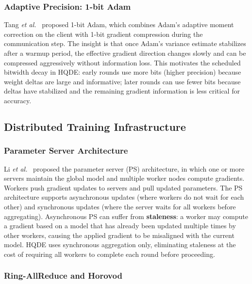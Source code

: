 \documentclass[journal,twoside]{IEEEtran}
\newcommand{\hqde}{\mbox{HQDE}\xspace}
\newcommand{\etal}{\textit{et al.}\xspace}
\begin{document}
\subsubsection{Adaptive Precision: 1-bit Adam}

Tang \etal~\cite{tang2021onebitadam} proposed 1-bit Adam, which
combines Adam's adaptive moment correction on the client with 1-bit
gradient compression during the communication step. The insight is
that once Adam's variance estimate stabilizes after a warmup period,
the effective gradient direction changes slowly and can be compressed
aggressively without information loss. This motivates the scheduled
bitwidth decay in \hqde{}: early rounds use more bits (higher precision)
because weight deltas are large and informative; later rounds can use
fewer bits because deltas have stabilized and the remaining gradient
information is less critical for accuracy.

\subsection{Distributed Training Infrastructure}

\subsubsection{Parameter Server Architecture}

Li \etal~\cite{li2014ps} proposed the parameter server (PS)
architecture, in which one or more servers maintain the global model
and multiple worker nodes compute gradients. Workers push gradient
updates to servers and pull updated parameters. The PS architecture
supports asynchronous updates (where workers do not wait for each other)
and synchronous updates (where the server waits for all workers before
aggregating). Asynchronous PS can suffer from \textbf{staleness}: a
worker may compute a gradient based on a model that has already been
updated multiple times by other workers, causing the applied gradient
to be misaligned with the current model. \hqde{} uses synchronous
aggregation only, eliminating staleness at the cost of requiring all
workers to complete each round before proceeding.

\subsubsection{Ring-AllReduce and Horovod}
\end{document}
